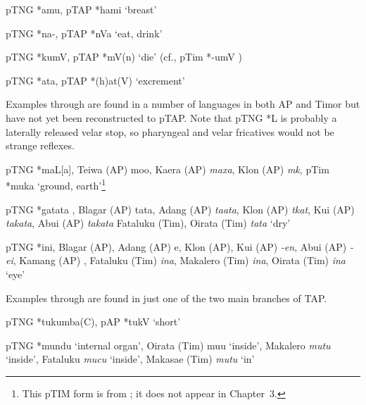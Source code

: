 \ea%
\label{ex:4:37}
\upshape pTNG *amu, pTAP *hami `breast'  
\z

\ea%
\label{ex:4:38}
\upshape   pTNG *na-, pTAP *nVa `eat, drink'  
\z

\ea%
\label{ex:4:39}
\upshape   pTNG *kumV, pTAP *mV(n) `die' (cf., pTim *-umV )  
\z

\ea%
\label{ex:4:40}
\upshape   pTNG *ata, pTAP *(h)at(V) `excrement'  
\z

Examples  through  are found in a number of languages in both AP and Timor but have not yet been reconstructed to pTAP. Note that pTNG *L is probably a laterally released velar stop, so pharyngeal and velar fricatives would not be strange reflexes.

\ea%
\label{ex:4:41}
\upshape   pTNG *maL[a], 
Teiwa (AP) mo{\pharfric}o{\textglotstop}, 
Kaera (AP) \textit{maxa}, 
Klon (AP) \textit{m{\textschwa}k{\textepsilon}{\textglotstop}}, 
pTim *muka `ground, earth'\footnote{This pTIM form is from \citet{SchapperEtAl2012historical}; it does not appear in Chapter~3.}  
\z

\ea%
\label{ex:4:42}
\upshape    pTNG *gatata , Blagar (AP) tata, Adang (AP) \textit{ta}\textit{{\textglotstop}}\textit{ata}, Klon (AP) \textit{t}\textit{{\textschwa}}\textit{kat}, Kui (AP) \textit{takata}, Abui (AP) \textit{takata} Fataluku (Tim), Oirata (Tim) \textit{tata} `dry'  
\z

\ea%
\label{ex:4:43}
\upshape  pTNG *ini, Blagar (AP), Adang (AP) e{\ng}, Klon (AP), Kui (AP) \textit{-en}, Abui (AP) \textit{-ei{\ng}}, Kamang (AP) \textit{{\ng}}, Fataluku (Tim) \textit{ina}, Makalero (Tim) \textit{ina}, Oirata (Tim) \textit{ina} `eye' 
   \z

Examples  through  are found in just one of the two main branches of TAP.

\ea%
\label{ex:4:44}
\upshape    pTNG *tukumba(C), pAP *tukV `short'  
\z

\ea%
\label{ex:4:45}
\upshape    pTNG *mundu `internal organ', Oirata (Tim) mu{\textrtailt}u `inside', Makalero \textit{mutu} `inside', Fataluku \textit{mucu }`inside', Makasae (Tim) \textit{mutu }`in'  
\z

